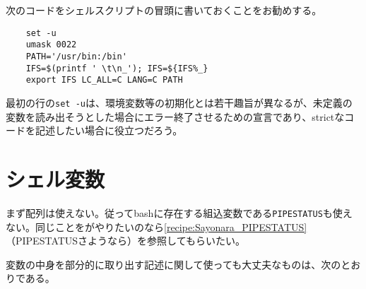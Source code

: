 次のコードをシェルスクリプトの冒頭に書いておくことをお勧めする。

\noindent
\begin{frameboxit}{160.0mm}
\begin{verbatim}
	set -u
	umask 0022
	PATH='/usr/bin:/bin'
	IFS=$(printf ' \t\n_'); IFS=${IFS%_}
	export IFS LC_ALL=C LANG=C PATH
\end{verbatim}
\end{frameboxit}
最初の行の\verb|set -u|は、環境変数等の初期化とは若干趣旨が異なるが、未定義の変数を読み出そうとした場合にエラー終了させるための宣言であり、strictなコードを記述したい場合に役立つだろう。

\section{シェル変数}

まず配列は使えない。従ってbashに存在する組込変数である\verb|PIPESTATUS|も使えない。同じことをがやりたいのなら\ref{recipe:Sayonara_PIPESTATUS}（PIPESTATUSさようなら）を参照してもらいたい。

変数の中身を部分的に取り出す記述に関して使っても大丈夫なものは、次のとおりである。

